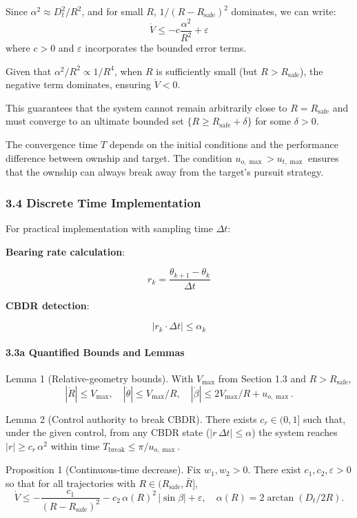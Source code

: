 \documentclass[11pt,a4paper]{article}
\numberwithin{equation}{section}
\begin{document}
Since $\alpha^2 \approx D_t^2/R^2$, and for small $R$, $1/(R-R_{\text{safe}})^2$ dominates, we can write:
\[
\dot{V} \leq -c \frac{\alpha^2}{R^2} + \varepsilon
\]
where $c > 0$ and $\varepsilon$ incorporates the bounded error terms.

Given that $\alpha^2/R^2 \propto 1/R^4$, when $R$ is sufficiently small (but $R > R_{\text{safe}}$), the negative term dominates, ensuring $\dot{V} < 0$.

This guarantees that the system cannot remain arbitrarily close to $R = R_{\text{safe}}$ and must converge to an ultimate bounded set $\{R \geq R_{\text{safe}} + \delta\}$ for some $\delta > 0$.

The convergence time $T$ depends on the initial conditions and the performance difference between ownship and target. The condition $u_{o,\max} > u_{t,\max}$ ensures that the ownship can always break away from the target's pursuit strategy.

\subsubsection{3.4 Discrete Time Implementation}

For practical implementation with sampling time $\Delta t$:

\textbf{Bearing rate calculation}:

\[
r_k = \frac{\theta_{k+1} - \theta_k}{\Delta t}
\]

\textbf{CBDR detection}:

\[
|r_k \cdot \Delta t| \leq \alpha_k
\]

\paragraph{3.3a Quantified Bounds and Lemmas}

Lemma 1 (Relative-geometry bounds). With $V_{\max}$ from Section 1.3 and $R>R_{\text{safe}}$,
\[
|\dot R|\le V_{\max},\quad |\dot \theta|\le V_{\max}/R,\quad |\dot \beta|\le 2V_{\max}/R+u_{o,\max}.
\]

Lemma 2 (Control authority to break CBDR). There exists $c_r\in(0,1]$ such that, under the given control, from any CBDR state ($|r\,\Delta t|\le \alpha$) the system reaches $|r|\ge c_r\,\alpha^2$ within time $T_{\text{break}}\le \pi/u_{o,\max}$.

Proposition 1 (Continuous-time decrease). Fix $w_1,w_2>0$. There exist $c_1,c_2,\varepsilon>0$ so that for all trajectories with $R\in(R_{\text{safe}},\bar R]$,
\[
\dot V \le -\frac{c_1}{(R-R_{\text{safe}})^2} - c_2\,\alpha(R)^2\,|\sin\beta| + \varepsilon,\quad \alpha(R)=2\arctan(D_t/2R).
\]
\end{document}
